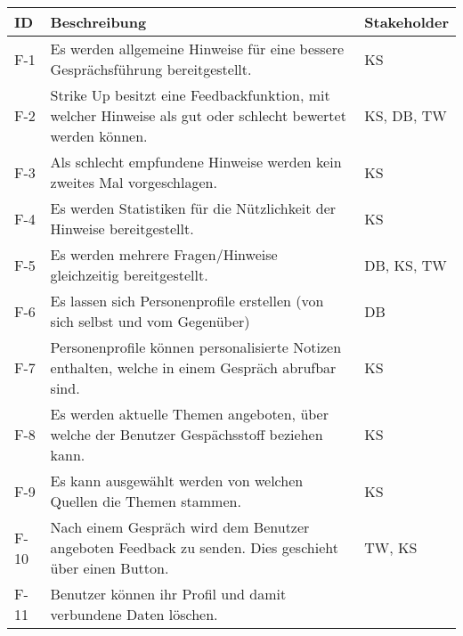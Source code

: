 \begin{table}[H]
    {
        \begin{tabularx}{\linewidth}{|C{1cm}|X|C{2cm}|}
            \hline
            ID & Beschreibung                                                                                                & Stakeholder \\
            \hline
            F-1
               & Es werden allgemeine Hinweise für eine bessere Gesprächsführung bereitgestellt.
               & KS
            \\
            F-2
               & Strike Up besitzt eine Feedbackfunktion, mit welcher Hinweise als gut oder schlecht bewertet werden können.
               & KS, DB, TW
            \\
            F-3
               & Als schlecht empfundene Hinweise werden kein zweites Mal vorgeschlagen.
               & KS
            \\
            F-4
               & Es werden Statistiken für die Nützlichkeit der Hinweise bereitgestellt.
               & KS
            \\
            F-5
               & Es werden mehrere Fragen/Hinweise gleichzeitig bereitgestellt.
               & DB, KS, TW
            \\
            F-6
               & Es lassen sich Personenprofile erstellen (von sich selbst und vom Gegenüber)
               & DB
            \\
            F-7
               & Personenprofile können personalisierte Notizen enthalten, welche in einem Gespräch abrufbar sind.
               & KS
            \\
            F-8
               & Es werden aktuelle Themen angeboten, über welche der Benutzer Gespächsstoff beziehen kann.
               & KS
            \\
            F-9
               & Es kann ausgewählt werden von welchen Quellen die Themen stammen.
               & KS
            \\
            F-10
               & Nach einem Gespräch wird dem Benutzer angeboten Feedback zu senden. Dies geschieht über einen Button.
               & TW, KS
            \\
            F-11
               & Benutzer können ihr Profil und damit verbundene Daten löschen.

\end{tabularx}}
\end{table}
